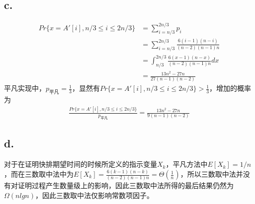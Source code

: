 \documentclass[12pt]{article}
\begin{document}
    \subsection*{c.}
      \begin{align*}
        Pr\{x=A'[i],n/3 \leq i \leq 2n/3\} &= \sum_{i=n/3}^{2n/3}p_i\\
        &=\sum_{i=n/3}^{2n/3}\frac{6(i-1)(n-i)}{(n-2)(n-1)n}\\
        &=\int_{n/3}^{2n/3}\frac{6(x-1)(n-x)}{(n-2)(n-1)n}dx\\
        &=\frac{13n^2-27n}{27(n-1)(n-2)}
      \end{align*}
    平凡实现中，$p_{平凡}=\frac{1}{3}$，显然有$Pr\{x=A'[i],n/3 \leq i \leq 2n/3\} > \frac{1}{3}$，增加的概率为
      \begin{align*}
        \frac{Pr\{x=A'[i],n/3 \leq i \leq 2n/3\}}{p_{平凡}}=\frac{13n^2-27n}{9(n-1)(n-2)}
      \end{align*}
    \subsection*{d.}
      对于在证明快排期望时间的时候所定义的指示变量$X_k$，平凡方法中$E[X_k]=1/n$，而在三数取中法中为$E[X_k]=\frac{6(k-1)(n-k)}{(n-2)(n-1)n}=\Theta\left(\frac{1}{n}\right)$，所以三数取中法并没有对证明过程产生数量级上的影响，因此三数取中法所得的最后结果仍然为$\Omega(nlgn)$，因此三数取中法仅影响常数项因子。
\end{document}
